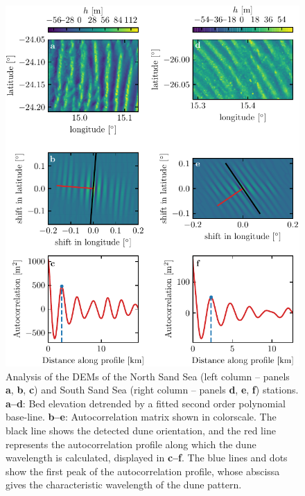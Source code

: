 \begin{figure}[p]
  \centering
  \includegraphics[scale=1]{Figures/Figure5_supp.pdf}
  \caption{Analysis of the DEMs of the North Sand Sea (left column -- panels \textbf{a}, \textbf{b}, \textbf{c}) and South Sand Sea (right column -- panels \textbf{d}, \textbf{e}, \textbf{f}) stations. \textbf{a--d}: Bed elevation detrended by a fitted second order polynomial base-line. \textbf{b--e}: Autocorrelation matrix shown in colorscale. The black line shows the detected dune orientation, and the red line represents the autocorrelation profile along which the dune wavelength is calculated, displayed in \textbf{c--f}. The blue lines and dots show the first peak of the autocorrelation profile, whose abscissa gives the characteristic wavelength of the dune pattern.}
  \label{Fig5_supp}
\end{figure}

